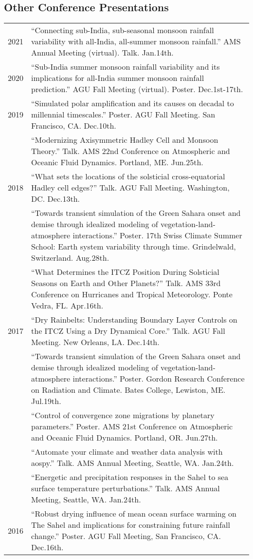 \documentclass[letterpaper,11pt]{shillcv}
\begin{document}
\subsection*{Other Conference Presentations}
\begin{longtable}{@{} Y{0.05\textwidth} L{0.95\textwidth} @{}}
2021 & ``Connecting sub-India, sub-seasonal monsoon rainfall variability with all-India, all-summer monsoon rainfall.'' AMS Annual Meeting (virtual).  Talk.  Jan.\@ 14th.\\
2020 & ``Sub-India summer monsoon rainfall variability and its implications for all-India summer monsoon rainfall prediction.''  AGU Fall Meeting (virtual).  Poster.  Dec.\@ 1st-17th.\\
2019 & ``Simulated polar amplification and its causes on decadal to millennial timescales.''  Poster.  AGU Fall Meeting.  San Francisco, CA.  Dec.\@ 10th.\\
     & ``Modernizing Axisymmetric Hadley Cell and Monsoon Theory.''  Talk.  AMS 22nd Conference on Atmospheric and Oceanic Fluid Dynamics.  Portland, ME.  Jun.\@ 25th.\\
2018 & ``What sets the locations of the solsticial cross-equatorial Hadley cell edges?''  Talk.  AGU Fall Meeting.  Washington, DC.  Dec.\@ 13th.\\
     & ``Towards transient simulation of the Green Sahara onset and demise through idealized modeling of vegetation-land-atmosphere interactions.''  Poster.  17th Swiss Climate Summer School: Earth system variability through time.  Grindelwald, Switzerland.  Aug.\@ 28th.\\
     & ``What Determines the ITCZ Position During Solsticial Seasons on Earth and Other Planets?''  Talk.  AMS 33rd Conference on Hurricanes and Tropical Meteorology.  Ponte Vedra, FL.  Apr.\@ 16th.\\
2017 & ``Dry Rainbelts: Understanding Boundary Layer Controls on the ITCZ Using a Dry Dynamical Core.''  Talk.  AGU Fall Meeting.  New Orleans, LA.  Dec.\@ 14th.\\
     & ``Towards transient simulation of the Green Sahara onset and demise through idealized modeling of vegetation-land-atmosphere interactions.''  Poster.  Gordon Research Conference on Radiation and Climate.  Bates College, Lewiston, ME.  Jul.\@ 19th.\\
     & ``Control of convergence zone migrations by planetary parameters.''  Poster.  AMS 21st Conference on Atmospheric and Oceanic Fluid Dynamics.  Portland, OR.  Jun.\@ 27th.\\
     & ``Automate your climate and weather data analysis with aospy.''  Talk.  AMS Annual Meeting, Seattle, WA.  Jan.\@ 24th.\\
     & ``Energetic and precipitation responses in the Sahel to sea surface temperature perturbations.''  Talk.  AMS Annual Meeting, Seattle, WA.  Jan.\@ 24th.\\
2016 & ``Robust drying influence of mean ocean surface warming on The Sahel and implications for constraining future rainfall change.''  Poster.  AGU Fall Meeting, San Francisco, CA.  Dec.\@ 16th.\\


\end{longtable}
\end{document}
